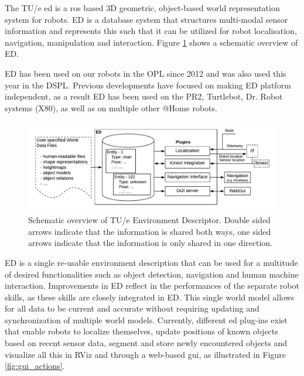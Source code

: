\label{sec:ed}
The TU/e \acrfull{ed} is a \acrfull{ros} based 3D geometric, object-based world representation system for robots. ED is a database system that structures multi-modal sensor information and represents this such that it can be utilized for robot localisation, navigation, manipulation and interaction. Figure \ref{fig:ed} shows a schematic overview of ED.

ED has been used on our robots in the OPL since 2012 and was also used this year in the DSPL. Previous developments have focused on making ED platform independent, as a result ED has been used on the PR2, Turtlebot, Dr. Robot systems (X80), as well as on multiple other @Home robots.
\begin{figure}[h]
	\includegraphics[width = 0.9\linewidth]{Figures/ed_overview}
	\caption{Schematic overview of TU/e Environment Descriptor. Double sided arrows indicate that the information is shared both ways, one sided arrows indicate that the information is only shared in one direction.}
	\label{fig:ed}
\end{figure}
ED is a single re-usable environment description that can be used for a multitude of desired functionalities such as object detection, navigation and human machine interaction. Improvements in ED reflect in the performances of the separate robot skills, as these skills are closely integrated in ED. This single world model allows for all data to be current and accurate without requiring updating and synchronization of multiple world models. Currently, different \acrshort{ed} plug-ins exist that enable robots to localize themselves, update positions of known objects based on recent sensor data, segment and store newly encountered objects and visualize all this in RViz and through a web-based \acrshort{gui}, as illustrated in Figure \ref{fig:gui_actions}.
